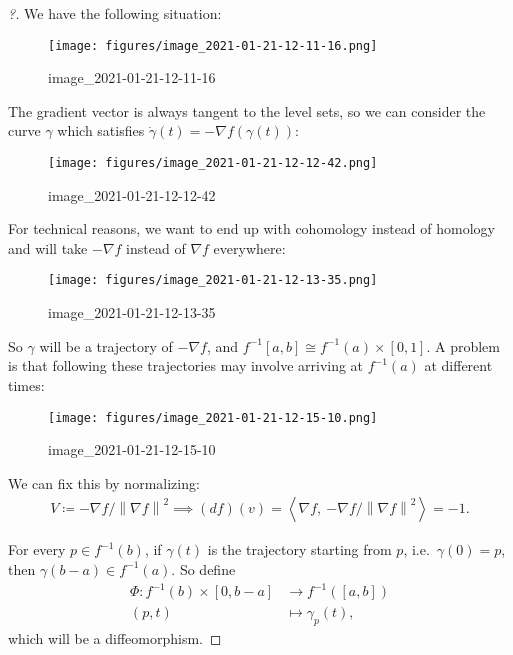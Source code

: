 \begin{proof}[?]

We have the following situation:

\begin{figure}
\centering
\texttt{[image: figures/image\_2021-01-21-12-11-16.png]}
\caption{image\_2021-01-21-12-11-16}
\end{figure}

The gradient vector is always tangent to the level sets, so we can
consider the curve \(\gamma\) which satisfies
\(\dot\gamma(t) = -\nabla f( \gamma(t))\):

\begin{figure}
\centering
\texttt{[image: figures/image\_2021-01-21-12-12-42.png]}
\caption{image\_2021-01-21-12-12-42}
\end{figure}

For technical reasons, we want to end up with cohomology instead of
homology and will take \(-\nabla f\) instead of \(\nabla f\) everywhere:

\begin{figure}
\centering
\texttt{[image: figures/image\_2021-01-21-12-13-35.png]}
\caption{image\_2021-01-21-12-13-35}
\end{figure}

So \(\gamma\) will be a trajectory of \(- \nabla f\), and
\(f ^{-1} [a, b] \cong f ^{-1} (a) \times[0, 1]\). A problem is that
following these trajectories may involve arriving at \(f ^{-1} (a)\) at
different times:

\begin{figure}
\centering
\texttt{[image: figures/image\_2021-01-21-12-15-10.png]}
\caption{image\_2021-01-21-12-15-10}
\end{figure}

We can fix this by normalizing:
\begin{align*}
V \coloneqq- \nabla f / {\left\lVert { \nabla f} \right\rVert}^2 \implies (df)(v) = {\left\langle { \nabla f},~{ - \nabla f / {\left\lVert {\nabla f} \right\rVert}^2} \right\rangle} = -1
.\end{align*}

For every \(p \in f ^{-1} (b)\), if \(\gamma(t)\) is the trajectory
starting from \(p\), i.e.~\(\gamma(0) = p\), then
\(\gamma(b-a) \in f ^{-1} (a)\). So define
\begin{align*}
\Phi: f ^{-1} (b) \times[0, b-a] &\to f ^{-1} ([a, b]) \\
(p, t) &\mapsto \gamma_p (t)
,\end{align*}
which will be a diffeomorphism.

\end{proof}

